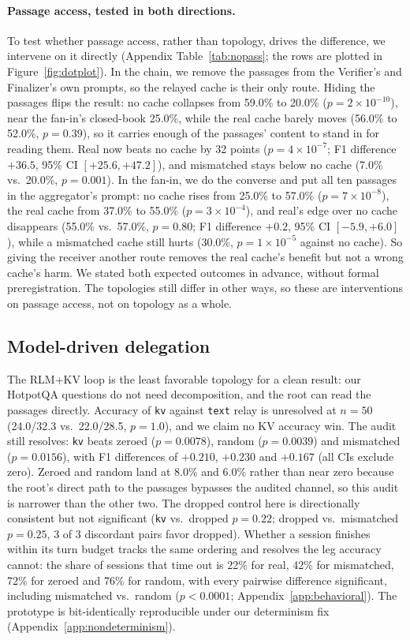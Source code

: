 \documentclass[11pt]{article}
\begin{document}
\paragraph{Passage access, tested in both directions.} To test whether passage
access, rather than topology, drives the difference, we intervene on it directly
(Appendix Table~\ref{tab:nopass}; the rows are plotted in
Figure~\ref{fig:dotplot}). In the chain, we remove the passages from the
Verifier's and Finalizer's own prompts, so the relayed cache is their only route.
Hiding the passages flips the result: no cache collapses from 59.0\% to
20.0\% ($p=2\times10^{-10}$), near the fan-in's closed-book 25.0\%, while the real
cache barely moves (56.0\% to 52.0\%, $p=0.39$), so it carries enough of the
passages' content to stand in for reading them. Real now beats no cache by 32
points ($p=4\times10^{-7}$; F1 difference $+36.5$, 95\% CI $[+25.6,+47.2]$), and
mismatched stays below no cache (7.0\% vs.\ 20.0\%, $p=0.001$). In the
fan-in, we do the converse and put all ten passages in the aggregator's prompt:
no cache rises from 25.0\% to 57.0\% ($p=7\times10^{-8}$), the real cache from
37.0\% to 55.0\% ($p=3\times10^{-4}$), and real's edge over no cache disappears
(55.0\% vs.\ 57.0\%, $p=0.80$; F1 difference $+0.2$, 95\% CI $[-5.9,+6.0]$), while
a mismatched cache still hurts (30.0\%, $p=1\times10^{-5}$ against no cache). So
giving the receiver another route removes the real cache's benefit but not
a wrong cache's harm. We stated both expected outcomes in advance, without formal preregistration. The
topologies still differ in other ways, so these are interventions on passage
access, not on topology as a whole.

\subsection{Model-driven delegation}

The RLM+KV loop is the least favorable topology for a clean result: our
HotpotQA questions do not need decomposition, and the root can read the
passages directly. Accuracy of \texttt{kv} against \texttt{text} relay is
unresolved at $n{=}50$ (24.0/32.3 vs.\ 22.0/28.5, $p=1.0$), and we claim
no KV accuracy win. The audit still resolves: \texttt{kv} beats zeroed
($p=0.0078$), random ($p=0.0039$) and mismatched ($p=0.0156$), with F1
differences of $+0.210$, $+0.230$ and $+0.167$ (all CIs exclude zero).
Zeroed and random land at 8.0\% and 6.0\% rather than near zero because
the root's direct path to the passages bypasses the audited channel, so
this audit is narrower than the other two. The dropped control here is
directionally consistent but not significant (\texttt{kv} vs.\ dropped
$p=0.22$; dropped vs.\ mismatched $p=0.25$, 3 of 3 discordant pairs favor
dropped). Whether a session finishes within its turn budget tracks the
same ordering and resolves the leg accuracy cannot: the share of sessions
that time out is 22\% for real, 42\% for mismatched, 72\% for zeroed and 76\%
for random, with every pairwise difference significant, including mismatched
vs.\ random ($p<0.0001$; Appendix~\ref{app:behavioral}). The prototype is
bit-identically reproducible under our determinism fix
(Appendix~\ref{app:nondeterminism}).
\end{document}
